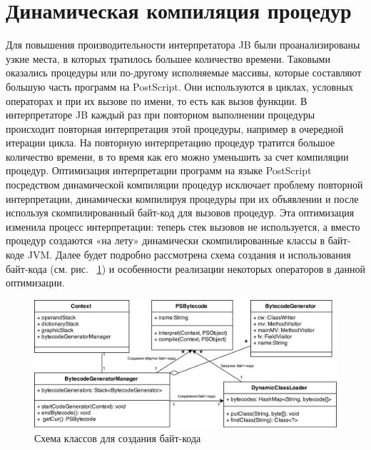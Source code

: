 \documentclass[14pt]{extarticle}
\begin{document}
	\section{Динамическая компиляция процедур}
	Для повышения производительности интерпретатора JB были проанализированы узкие места, в которых тратилось большее количество времени. Таковыми оказались процедуры или по-другому исполняемые массивы, которые составляют большую часть программ на PostScript. Они используются в циклах, условных операторах и при их вызове по имени, то есть как вызов функции.  
	В интерпретаторе JB каждый раз при повторном выполнении процедуры происходит повторная интерпретация этой процедуры, например в очередной итерации цикла. На повторную интерпретацию процедур тратится большое количество времени, в то время как его можно уменьшить за счет компиляции процедур.
	Оптимизация интерпретации программ на языке PostScript посредством динамической компиляции процедур исключает проблему повторной интерпретации, динамически компилируя процедуры при их объявлении и после используя скомпилированный байт-код для вызовов процедур.  	
	Эта оптимизация изменила процесс интерпретации: теперь стек вызовов не используется, а вместо процедур создаются «на лету» динамически скомпилированные классы в байт-коде JVM. Далее будет подробно рассмотрена схема создания и использования байт-кода (см. рис. ~\ref{scheme}) и особенности реализации некоторых операторов в данной оптимизации.
	
	\begin{figure} [h]
		\includegraphics[width=\linewidth]{bytecode_generation.png}
		\caption{Схема классов для создания байт-кода}\label{scheme}
	\end{figure}
\end{document}
